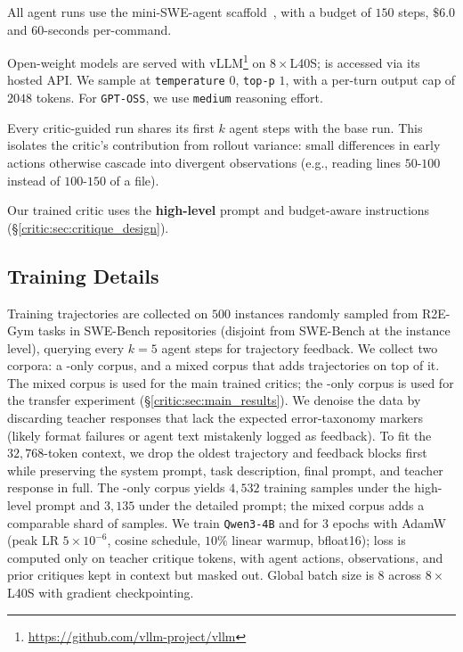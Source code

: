  All agent runs use the mini-SWE-agent scaffold~\cite{swe-agent}, with a budget of $150$ steps, $\$6.0$ and $60$-seconds per-command.

 Open-weight models are served with vLLM\footnote{\url{https://github.com/vllm-project/vllm}} on $8\times$L40S; \criticopus{} is accessed via its hosted API. We sample at \texttt{temperature} $0$, \texttt{top-p} $1$, with a per-turn output cap of $2048$ tokens. For \texttt{GPT-OSS}, we use \texttt{medium} reasoning effort.

 Every critic-guided run shares its first $k$ agent steps with the base run. This isolates the critic's contribution from rollout variance: small differences in early actions otherwise cascade into divergent observations (e.g., reading lines $50$-$100$ instead of $100$-$150$ of a file).

 Our trained critic uses the \textbf{high-level} prompt and budget-aware instructions (§\ref{critic:sec:critique_design}).

\subsection{Training Details}
\label{critic:sec:setup_training}
Training trajectories are collected on $500$ instances randomly sampled from R2E-Gym tasks in SWE-Bench repositories (disjoint from SWE-Bench at the instance level), querying \criticopus{} every $k=5$ agent steps for trajectory feedback. We collect two corpora: a \criticcwm{}-only corpus, and a mixed corpus that adds \criticqwenNext{} trajectories on top of it. The mixed corpus is used for the main trained critics; the \criticcwm{}-only corpus is used for the transfer experiment (§\ref{critic:sec:main_results}). We denoise the data by discarding teacher responses that lack the expected error-taxonomy markers (likely format failures or agent text mistakenly logged as feedback). To fit the $32{,}768$-token context, we drop the oldest trajectory and feedback blocks first while preserving the system prompt, task description, final prompt, and teacher response in full. The \criticcwm{}-only corpus yields $4{,}532$ training samples under the high-level prompt and $3{,}135$ under the detailed prompt; the mixed corpus adds a comparable shard of \criticqwenNext{} samples. We train \texttt{Qwen3-4B} and \criticqwenEightB{} for 3 epochs with AdamW (peak LR $5{\times}10^{-6}$, cosine schedule, $10\%$ linear warmup, bfloat16); loss is computed only on teacher critique tokens, with agent actions, observations, and prior critiques kept in context but masked out. Global batch size is 8 across $8{\times}$L40S with gradient checkpointing.

